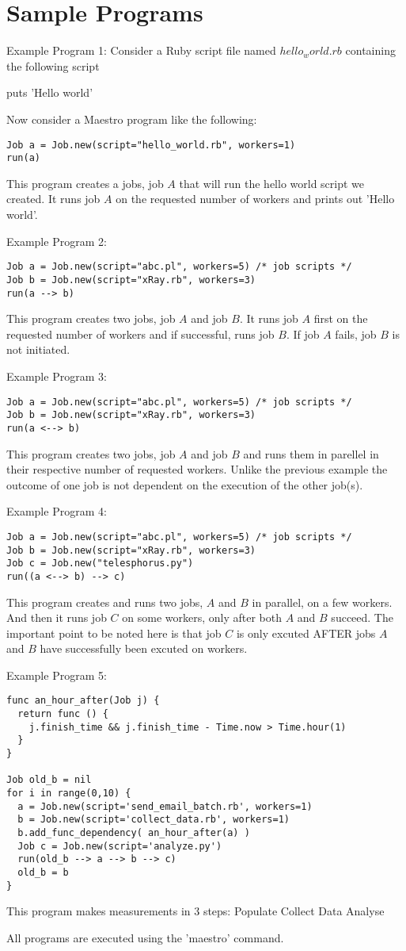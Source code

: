 \section{Sample Programs}
\label{sect:samples}
Example Program 1:
Consider a Ruby script file named $hello_world.rb$ containing the following script

puts 'Hello world'

Now consider a Maestro program like the following:
\begin{lstlisting}
Job a = Job.new(script="hello_world.rb", workers=1)
run(a)
\end{lstlisting}
This program creates a jobs, job $A$ that will run the hello world script we created. 
It runs job $A$ on the requested number of workers and prints out 'Hello world'.


Example Program 2:
\begin{lstlisting}
Job a = Job.new(script="abc.pl", workers=5) /* job scripts */
Job b = Job.new(script="xRay.rb", workers=3)
run(a --> b)
\end{lstlisting}
This program creates two jobs, job $A$ and job $B$. It runs job $A$ first on the requested number of workers
and if successful, runs job $B$. If job $A$ fails, job $B$ is not initiated.

Example Program 3:
\begin{lstlisting}
Job a = Job.new(script="abc.pl", workers=5) /* job scripts */
Job b = Job.new(script="xRay.rb", workers=3)
run(a <--> b)
\end{lstlisting}
This program creates two jobs, job $A$ and job $B$ and runs them in parellel in their respective number of requested workers.
Unlike the previous example the outcome of one job is not dependent on the execution of the other job(s).

Example Program 4: 
\begin{lstlisting}
Job a = Job.new(script="abc.pl", workers=5) /* job scripts */
Job b = Job.new(script="xRay.rb", workers=3)
Job c = Job.new("telesphorus.py")
run((a <--> b) --> c)
\end{lstlisting}
This program creates and runs two jobs, $A$ and $B$ in parallel, on a few
workers. And then it runs job $C$ on some workers, only after both $A$
and $B$ succeed. The important point to be noted here is that job $C$ is 
only excuted AFTER jobs $A$ and $B$ have successfully been excuted on workers.

Example Program 5:
\begin{lstlisting}
func an_hour_after(Job j) {
  return func () {
    j.finish_time && j.finish_time - Time.now > Time.hour(1)
  }
}

Job old_b = nil
for i in range(0,10) {
  a = Job.new(script='send_email_batch.rb', workers=1)
  b = Job.new(script='collect_data.rb', workers=1)
  b.add_func_dependency( an_hour_after(a) )
  Job c = Job.new(script='analyze.py')
  run(old_b --> a --> b --> c)
  old_b = b
}
\end{lstlisting}
This program makes measurements in 3 steps:
Populate
Collect Data
Analyse


All programs are executed using the 'maestro' command.
